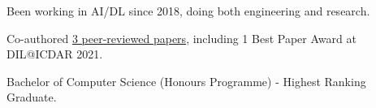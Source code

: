 % 
\begin{zitemize}
    \item Been working in AI/DL since 2018, doing both engineering and research.
    \item Co-authored \href{https://scholar.google.com/citations?user=\gscholarid}{3 peer-reviewed papers}, including 1 Best Paper Award at DIL@ICDAR 2021.
    \item Bachelor of Computer Science (Honours Programme) - Highest Ranking Graduate.
\end{zitemize}
